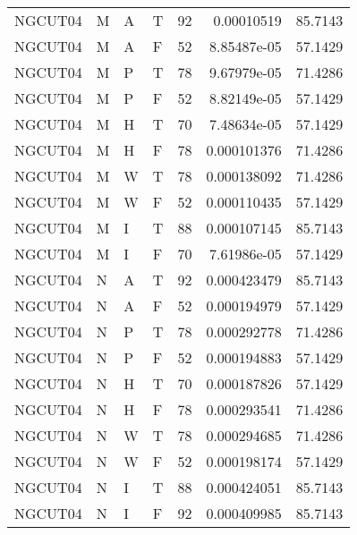\begin{tabular}{llllrrr}
    NGCUT04  & M     & A     & T          & 92         & 0.00010519  & 85.7143  \\
    NGCUT04  & M     & A     & F          & 52         & 8.85487e-05 & 57.1429  \\
    NGCUT04  & M     & P     & T          & 78         & 9.67979e-05 & 71.4286  \\
    NGCUT04  & M     & P     & F          & 52         & 8.82149e-05 & 57.1429  \\
    NGCUT04  & M     & H     & T          & 70         & 7.48634e-05 & 57.1429  \\
    NGCUT04  & M     & H     & F          & 78         & 0.000101376 & 71.4286  \\
    NGCUT04  & M     & W     & T          & 78         & 0.000138092 & 71.4286  \\
    NGCUT04  & M     & W     & F          & 52         & 0.000110435 & 57.1429  \\
    NGCUT04  & M     & I     & T          & 88         & 0.000107145 & 85.7143  \\
    NGCUT04  & M     & I     & F          & 70         & 7.61986e-05 & 57.1429  \\
    NGCUT04  & N     & A     & T          & 92         & 0.000423479 & 85.7143  \\
    NGCUT04  & N     & A     & F          & 52         & 0.000194979 & 57.1429  \\
    NGCUT04  & N     & P     & T          & 78         & 0.000292778 & 71.4286  \\
    NGCUT04  & N     & P     & F          & 52         & 0.000194883 & 57.1429  \\
    NGCUT04  & N     & H     & T          & 70         & 0.000187826 & 57.1429  \\
    NGCUT04  & N     & H     & F          & 78         & 0.000293541 & 71.4286  \\
    NGCUT04  & N     & W     & T          & 78         & 0.000294685 & 71.4286  \\
    NGCUT04  & N     & W     & F          & 52         & 0.000198174 & 57.1429  \\
    NGCUT04  & N     & I     & T          & 88         & 0.000424051 & 85.7143  \\
    NGCUT04  & N     & I     & F          & 92         & 0.000409985 & 85.7143  \\
    \hline
\end{tabular}